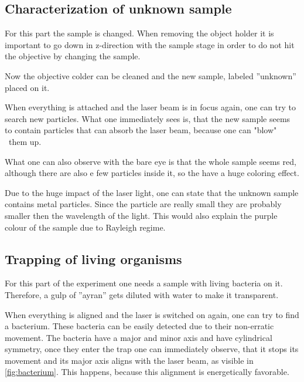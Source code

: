 \documentclass[12pt,english]{scrartcl}
\begin{document}
\subsection{Characterization of unknown sample}


For this part the sample is changed. When removing the object holder it is
important to go down in z-direction with the sample stage in order to do not
hit the objective by changing the sample.

Now the objective colder can be cleaned and the new sample, labeled ''unknown''
placed on it.

When everything is attached and the laser beam is in focus again, one can try
to search new particles. What one immediately sees is, that the new sample
seems to contain particles that can absorb the laser beam, because one can
"blow" \ them up.


What one can also observe with the bare eye is that the whole sample seems red,
although there are also e few particles inside it, so the have a huge coloring
effect.

Due to the huge impact of the laser light, one can state that the unknown
sample contains metal particles. Since the particle are really small they are
probably smaller then the wavelength of the light. This would also explain the
purple colour of the sample due to Rayleigh regime.

\subsection{Trapping of living organisms}

For this part of the experiment one needs a sample with living bacteria on it.
Therefore, a gulp of ''ayran'' gets diluted with water to make it transparent.

When everything is aligned and the laser is switched on again, one can try to
find a bacterium. These bacteria can be easily detected due to their
non-erratic movement. The bacteria have a major and minor axis and have
cylindrical symmetry, once they enter the trap one can immediately observe,
that it stops its movement and its major axis aligns with the laser beam, as
visible in \autoref{fig:bacterium}. This happens, because this alignment is
energetically favorable.
\end{document}
